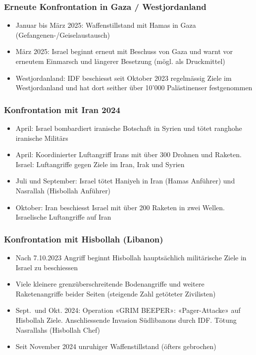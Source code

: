 {}\documentclass[a4paper]{article}
\newlength{\inmar}
\providecommand{\tightlist}{\setlength{\itemsep}{1mm}\setlength{\parskip}{1mm}}
\begin{document}
\subsubsection{Erneute Konfrontation in Gaza /
	Westjordanland}\label{erneute-konfrontation-in-gaza-westjordanland}

\begin{itemize}
	\tightlist
	\item
	      Januar bis März 2025: Waffenstillstand mit Hamas in Gaza
	      (Gefangenen-/Geiselaustausch)
	\item
	      März 2025: Israel beginnt erneut mit Beschuss von Gaza und warnt vor
	      erneutem Einmarsch und längerer Besetzung (mögl. als Druckmittel)
	\item
	      Westjordanland: IDF beschiesst seit Oktober 2023 regelmässig Ziele im
	      Westjordanland und hat dort seither über 10'000 Palästinenser
	      festgenommen
\end{itemize}

\subsubsection{Konfrontation mit Iran
	2024}\label{konfrontation-mit-iran-2024}

\begin{itemize}
	\tightlist
	\item
	      April: Israel bombardiert iranische Botschaft in Syrien und tötet
	      ranghohe iranische Militärs
	\item
	      April: Koordinierter Luftangriff Irans mit über 300 Drohnen und
	      Raketen. Israel: Luftangriffe gegen Ziele im Iran, Irak und Syrien
	\item
	      Juli und September: Israel tötet Haniyeh in Iran (Hamas Anführer) und
	      Nasrallah (Hisbollah Anführer)
	\item
	      Oktober: Iran beschiesst Israel mit über 200 Raketen in zwei Wellen.
	      Israelische Luftangriffe auf Iran
\end{itemize}

\subsubsection{Konfrontation mit Hisbollah
	(Libanon)}\label{konfrontation-mit-hisbollah-libanon}

\begin{itemize}
	\tightlist
	\item
	      Nach 7.10.2023 Angriff beginnt Hisbollah hauptsächlich militärische
	      Ziele in Israel zu beschiessen
	\item
	      Viele kleinere grenzüberschreitende Bodenangriffe und weitere
	      Raketenangriffe beider Seiten (steigende Zahl getöteter Zivilisten)
	\item
	      Sept.~und Okt. 2024: Operation «GRIM BEEPER»: «Pager-Attacke» auf
	      Hisbollah Ziele. Anschliessende Invasion Südlibanons durch IDF. Tötung
	      Nasrallahs (Hisbollah Chef)
	\item
	      Seit November 2024 unruhiger Waffenstillstand (öfters gebrochen)
\end{itemize}
\end{document}
